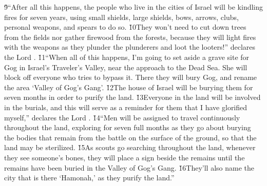 \v{9}``After all this happens, the people who live in the cities of Israel will be kindling fires for seven years, using small shields, large shields, bows, arrows, clubs, personal weapons, and spears to do so. \v{10}They won't need to cut down trees from the fields nor gather firewood from the forests, because they will light fires with the weapons as they plunder the plunderers and loot the looters!'' declares the Lord . \v{11}``When all of this happens, I'm going to set aside a grave site for Gog in Israel's Traveler's Valley, near the approach to the Dead Sea. She will block off everyone who tries to bypass it. There they will bury Gog, and rename the area `Valley of Gog's Gang'. \v{12}The house of Israel will be burying them for seven months in order to purify the land. \v{13}Everyone in the land will be involved in the burials, and this will serve as a reminder for them that I have glorified myself,'' declares the Lord . \v{14}``Men will be assigned to travel continuously throughout the land, exploring for seven full months as they go about burying the bodies that remain from the battle on the surface of the ground, so that the land may be sterilized. \v{15}As scouts go searching throughout the land, whenever they see someone's bones, they will place a sign beside the remains until the remains have been buried in the Valley of Gog's Gang. \v{16}They'll also name the city that is there `Hamonah,' as they purify the land.''

